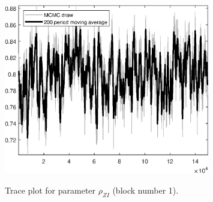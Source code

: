 \begin{figure}[H]
\centering
  \includegraphics[width=0.8\textwidth]{BRS_gen/graphs/TracePlot_rho_ZI_blck_1}\\
    \caption{Trace plot for parameter ${\rho_{ZI}}$ (block number 1).}
\end{figure}
